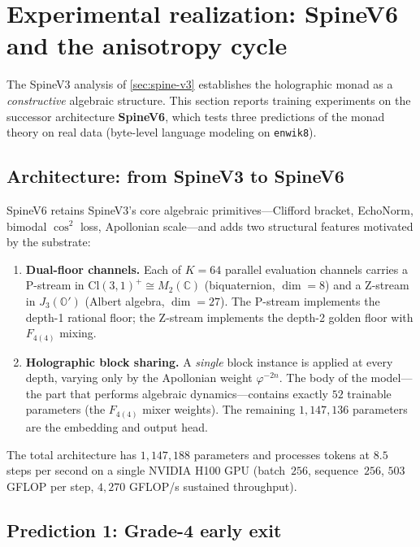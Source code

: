 \documentclass[11pt,a4paper]{article}
\theoremstyle{plain}
\theoremstyle{definition}
\theoremstyle{remark}
\numberwithin{equation}{section}
\providecommand{\Cl}{\mathrm{Cl}}
\providecommand{\C}{\mathbb{C}}
\providecommand{\Os}{\mathbb{O}'}
\providecommand{\vp}{\varphi}
\begin{document}
\section{Experimental realization: SpineV6 and the anisotropy cycle}
\label{sec:spine-v6}

The SpineV3 analysis of \cref{sec:spine-v3} establishes the
holographic monad as a \emph{constructive} algebraic structure.
This section reports training experiments on the successor
architecture \textbf{SpineV6}, which tests three predictions of the
monad theory on real data (byte-level language modeling on
\texttt{enwik8}).

\subsection{Architecture: from SpineV3 to SpineV6}

SpineV6 retains SpineV3's core algebraic primitives---Clifford
bracket, EchoNorm, bimodal $\cos^2$ loss, Apollonian scale---and
adds two structural features motivated by the substrate:

\begin{enumerate}[label=(\roman*), nosep]
  \item \textbf{Dual-floor channels.}  Each of $K = 64$ parallel
    evaluation channels carries a P-stream in
    $\Cl(3,1)^+ \cong M_2(\C)$ (biquaternion, $\dim = 8$) and a
    Z-stream in $J_3(\Os)$ (Albert algebra, $\dim = 27$).  The
    P-stream implements the depth-1 rational floor; the Z-stream
    implements the depth-2 golden floor with $F_{4(4)}$ mixing.
  \item \textbf{Holographic block sharing.}  A \emph{single} block
    instance is applied at every depth, varying only by the
    Apollonian weight $\vp^{-2n}$.  The body of the model---the
    part that performs algebraic dynamics---contains exactly $52$
    trainable parameters (the $F_{4(4)}$ mixer weights).
    The remaining $1{,}147{,}136$ parameters are the embedding
    and output head.
\end{enumerate}

The total architecture has $1{,}147{,}188$ parameters and processes
tokens at $8.5$ steps per second on a single NVIDIA H100 GPU
(batch~$256$, sequence~$256$, $503$ GFLOP per step, $4{,}270$
GFLOP/s sustained throughput).

\subsection{Prediction 1: Grade-4 early exit}
\end{document}

